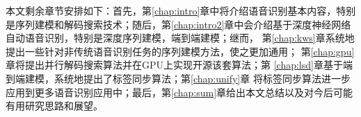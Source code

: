 本文剩余章节安排如下：首先，第\ref{chap:intro}章中将介绍语音识别基本内容，特别是序列建模和解码搜索技术；随后，第\ref{chap:intro2}章中会介绍基于深度神经网络自动语音识别，特别是深度序列建模，端到端建模；继而，
第\ref{chap:kws}章系统地提出一些针对非传统语音识别任务的序列建模方法，使之更加通用；
第\ref{chap:gpu}章将提出并行解码搜索算法并在GPU上实现开源该套算法；第
\ref{chap:lsd}章基于端到端建模，系统地提出了标签同步算法；第\ref{chap:unify}章
将标签同步算法进一步应用到更多语音识别应用中；最后，第\ref{chap:sum}章给出本文总结以及对今后可能有用研究思路和展望。
